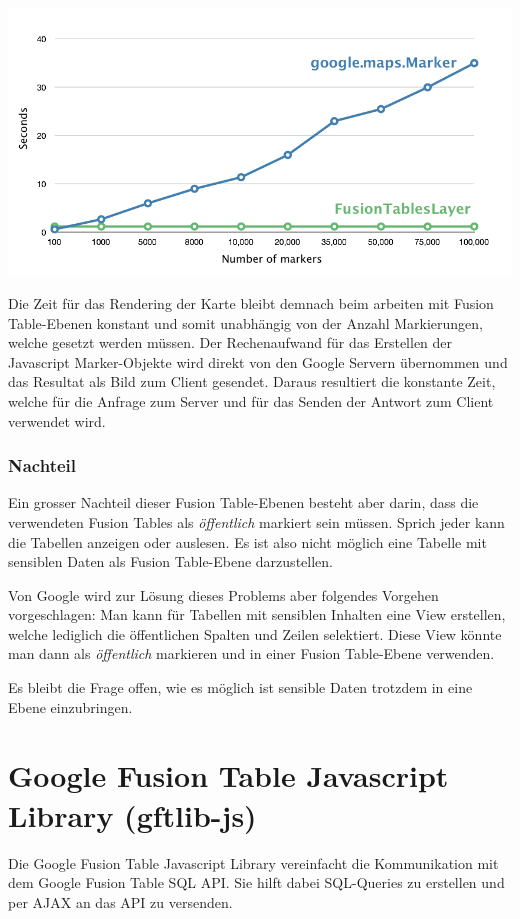 \includegraphics[scale=0.5]{images/gmap_fusiontableslayer_vs_markers.png}

Die Zeit für das Rendering der Karte bleibt demnach beim arbeiten mit Fusion Table-Ebenen konstant und somit unabhängig von der Anzahl Markierungen, welche gesetzt werden müssen. Der Rechenaufwand für das Erstellen der Javascript Marker-Objekte wird direkt von den Google Servern übernommen und das Resultat als Bild zum Client gesendet. Daraus resultiert die konstante Zeit, welche für die Anfrage zum Server und für das Senden der Antwort zum Client verwendet wird.

\subsubsection{Nachteil}
Ein grosser Nachteil dieser Fusion Table-Ebenen besteht aber darin, dass die verwendeten Fusion Tables als  \emph{öffentlich} markiert sein müssen. Sprich jeder kann die Tabellen anzeigen oder auslesen. Es ist also nicht möglich eine Tabelle mit sensiblen Daten als Fusion Table-Ebene darzustellen.

Von Google wird zur Lösung dieses Problems aber folgendes Vorgehen vorgeschlagen: Man kann für Tabellen mit sensiblen Inhalten eine View erstellen, welche lediglich die öffentlichen Spalten und Zeilen selektiert. Diese View könnte man dann als \emph{öffentlich} markieren und in einer Fusion Table-Ebene verwenden.

Es bleibt die Frage offen, wie es möglich ist sensible Daten trotzdem in eine Ebene einzubringen.

\section{Google Fusion Table Javascript Library (gftlib-js)}
Die Google Fusion Table Javascript Library vereinfacht die Kommunikation mit dem Google Fusion Table SQL API. Sie hilft dabei SQL-Queries zu erstellen und per AJAX an das API zu versenden.

